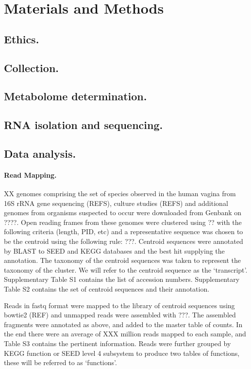 \documentclass[10pt,letterpaper]{article}
\begin{document}
\section*{Materials and Methods}
\subsection*{Ethics.}
\subsection*{Collection.}
\subsection*{Metabolome determination.}
\subsection*{RNA isolation and sequencing.}
\subsection*{Data analysis.} 

\paragraph{Read Mapping.} XX genomes comprising the set of species observed in the human vagina from 16S rRNA gene sequencing (REFS), culture studies (REFS) and additional genomes from organisms suspected to occur were downloaded from Genbank on ????. Open reading frames from these genomes were clustered using ?? with the following criteria (length, PID, etc) and a representative sequence was chosen to be the centroid using the following rule: ???. Centroid sequences were annotated by BLAST to SEED and KEGG databases and the best hit supplying the annotation. The taxonomy of the centroid sequences was taken to represent the taxonomy of the cluster. We will refer to the centroid sequence as the `transcript'. Supplementary Table S1 contains the list of accession numbers. Supplementary Table S2 contains the set of centroid sequences and their annotation. 

Reads in fastq format were mapped to the library of centroid sequences using bowtie2 (REF) and unmapped reads were assembled with ???. The assembled fragments were annotated as above, and added to the master table of counts. In the end there were an average of XXX million reads mapped to each sample, and Table S3 contains the pertinent information. Reads were further grouped by KEGG function or SEED level 4 subsystem to produce two tables of functions, these will be referred to as `functions'.
\end{document}
